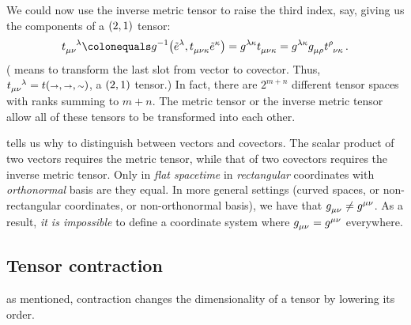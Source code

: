 We could now use the inverse metric tensor to raise the third index, say, giving us the components of a $\torder 21$ tensor:
%
\begin{equation}\label{eq:exampleofinversemetrictransformationofatensor}
  \tensor{t}{_\mu_\nu^\lambda} \defas \invmet\vat{\tbcov\lambda,\tensor{t}{_\mu_\nu_\kappa}\tbcov\kappa}
                               = \tinvmet\lambda\kappa\tensor{t}{_\mu_\nu_\kappa}
                               = \tinvmet\lambda\kappa\tmetric\mu\rho\tensor{t}{^\rho_\nu_\kappa}\,.
\end{equation}
%
( means to transform the last slot from vector to covector. Thus, $\tensor{t}{_\mu_\nu^\lambda} = t\vat{\vslot,\vslot,\cslot}$, a $\torder 21$ tensor.)
%
In fact, there are $2^{m + n}$ different tensor spaces with ranks summing to $m + n$. The metric tensor or the inverse metric tensor allow all of these tensors to be transformed into each other.

  tells us why to distinguish between vectors and covectors. The scalar product of two vectors requires the metric tensor, while that of two covectors requires the inverse metric tensor. Only in \emph{flat spacetime} in \emph{rectangular} coordinates with \emph{orthonormal} basis are they equal. In more general settings (curved spaces, or non-rectangular coordinates, or non-orthonormal basis), we have that $\tmetric\mu\nu\neq\tinvmet\mu\nu$. As a result, \emph{it is impossible} to define a coordinate system where $\tmetric\mu\nu = \tinvmet\mu\nu$ everywhere.


\subsection{Tensor contraction}
%
 as mentioned, contraction changes the dimensionality of a tensor by lowering its order. 

